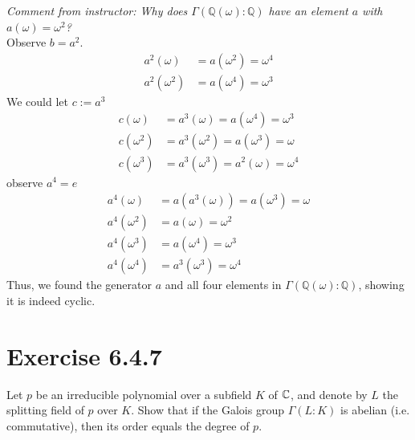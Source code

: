 \documentclass[12pt,english]{article}
\begin{document}
\textit{Comment from instructor: Why does $\Gamma(\mathbb{Q}(\omega):\mathbb{Q})$
have an element $a$ with $a(\omega) = \omega^2$?}\\
Observe $b=a^2$.
\begin{align}
    a^2(\omega) &= a(\omega^2) = \omega^4\\
    a^2 (\omega^2) &= a (\omega^4) = \omega^3
\end{align}
We could let $c:= a^3$
\begin{align}
    c(\omega) &= a^3(\omega) = a(\omega^4) = \omega^3\\
    c(\omega^2) &= a^3(\omega^2) = a (\omega^3) = \omega\\
    c(\omega^3) &= a^3 (\omega^3) = a^2(\omega) = \omega^4
\end{align}
observe $a^4 = e$\\
\begin{align}
    a^4 (\omega) &= a( a^3(\omega) ) = a(\omega^3) = \omega\\
    a^4 (\omega^2) &= a(\omega) = \omega^2\\
    a^4 (\omega^3) &= a(\omega^4) = \omega^3\\
    a^4 (\omega^4) &= a^3 (\omega^3) = \omega^4
\end{align}
Thus, we found the generator $a$ and all four elements
in $\Gamma(\mathbb{Q}(\omega):\mathbb{Q})$, showing it is indeed cyclic.


\section*{Exercise 6.4.7}
\begin{question}
    Let $p$ be an irreducible polynomial over a subfield $K$ of $\mathbb{C}$, and denote by $L$ the splitting field of $p$ over $K$. 
    Show that if the Galois group $\Gamma (L:K)$ is abelian (i.e. commutative), 
    then its order equals the degree of $p$.
\end{question}
\end{document}
